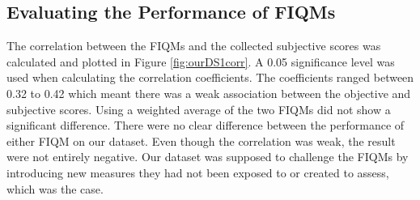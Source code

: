 \subsection{Evaluating the Performance of FIQMs}
The correlation between the FIQMs and the collected subjective scores was calculated and plotted in Figure \ref{fig:ourDS1corr}. A 0.05 significance level was used when calculating the correlation coefficients. The coefficients ranged between 0.32 to 0.42 which meant there was a weak association between the objective and subjective scores. Using a weighted average of the two FIQMs did not show a significant difference. There were no clear difference between the performance of either FIQM on our dataset. Even though the correlation was weak, the result were not entirely negative. Our dataset was supposed to challenge the FIQMs by introducing new measures they had not been exposed to or created to assess, which was the case. 

